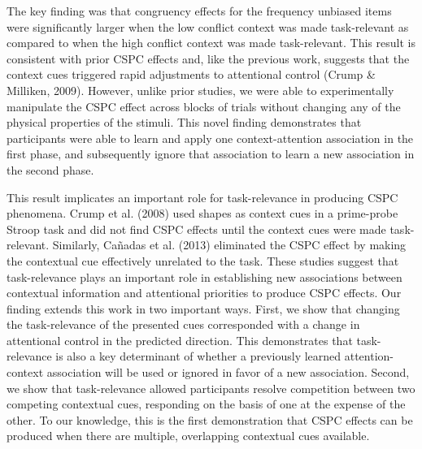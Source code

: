 \documentclass[english,,man,floatsintext]{apa6}
\begin{document}
The key finding was that congruency effects for the frequency unbiased items were significantly larger when the low conflict context was made task-relevant as compared to when the high conflict context was made task-relevant. This result is consistent with prior CSPC effects and, like the previous work, suggests that the context cues triggered rapid adjustments to attentional control (Crump \& Milliken, 2009). However, unlike prior studies, we were able to experimentally manipulate the CSPC effect across blocks of trials without changing any of the physical properties of the stimuli. This novel finding demonstrates that participants were able to learn and apply one context-attention association in the first phase, and subsequently ignore that association to learn a new association in the second phase.

This result implicates an important role for task-relevance in producing CSPC phenomena. Crump et al. (2008) used shapes as context cues in a prime-probe Stroop task and did not find CSPC effects until the context cues were made task-relevant. Similarly, Cañadas et al. (2013) eliminated the CSPC effect by making the contextual cue effectively unrelated to the task. These studies suggest that task-relevance plays an important role in establishing new associations between contextual information and attentional priorities to produce CSPC effects. Our finding extends this work in two important ways. First, we show that changing the task-relevance of the presented cues corresponded with a change in attentional control in the predicted direction. This demonstrates that task-relevance is also a key determinant of whether a previously learned attention-context association will be used or ignored in favor of a new association. Second, we show that task-relevance allowed participants resolve competition between two competing contextual cues, responding on the basis of one at the expense of the other. To our knowledge, this is the first demonstration that CSPC effects can be produced when there are multiple, overlapping contextual cues available.
\end{document}
